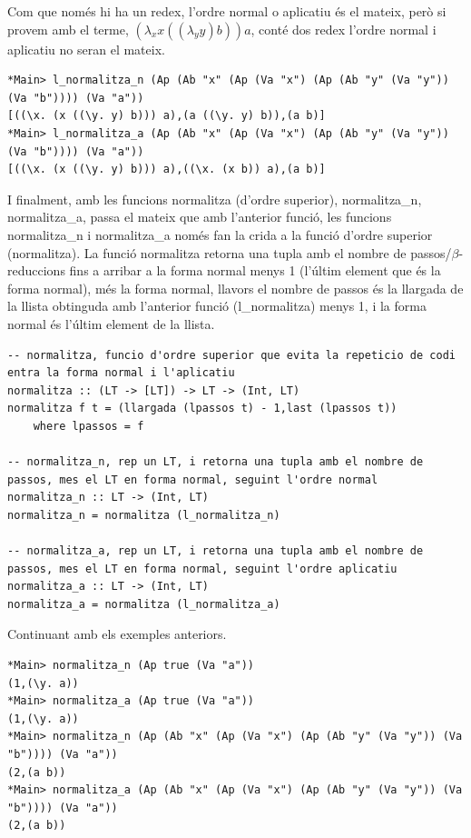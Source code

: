 \documentclass[10pt,a4paper]{article}
\begin{document}
Com que només hi ha un redex, l'ordre normal o aplicatiu és el mateix, però si provem amb el terme, $(\lambda_x x ((\lambda_y y) b)) a$, conté dos redex l'ordre normal i aplicatiu no seran el mateix.

\lstset{language=Haskell, breaklines=true, basicstyle=\footnotesize}
\begin{lstlisting}[frame=mystyle]
*Main> l_normalitza_n (Ap (Ab "x" (Ap (Va "x") (Ap (Ab "y" (Va "y")) (Va "b")))) (Va "a"))
[((\x. (x ((\y. y) b))) a),(a ((\y. y) b)),(a b)]
*Main> l_normalitza_a (Ap (Ab "x" (Ap (Va "x") (Ap (Ab "y" (Va "y")) (Va "b")))) (Va "a"))
[((\x. (x ((\y. y) b))) a),((\x. (x b)) a),(a b)]
\end{lstlisting}

I finalment, amb les funcions normalitza (d'ordre superior), normalitza\_n, normalitza\_a, passa el mateix que amb l'anterior funció, les funcions normalitza\_n i normalitza\_a només fan la crida a la funció d'ordre superior (normalitza). La funció normalitza retorna una tupla amb el nombre de passos/$\beta$-reduccions fins a arribar a la forma normal menys 1 (l'últim element que és la forma normal), més la forma normal, llavors el nombre de passos és la llargada de la llista obtinguda amb l'anterior funció (l\_normalitza) menys 1, i la forma normal és l'últim element de la llista.

\lstset{language=Haskell, breaklines=true, basicstyle=\footnotesize}
\begin{lstlisting}[frame=mystyle]
-- normalitza, funcio d'ordre superior que evita la repeticio de codi entra la forma normal i l'aplicatiu
normalitza :: (LT -> [LT]) -> LT -> (Int, LT)
normalitza f t = (llargada (lpassos t) - 1,last (lpassos t))
    where lpassos = f

-- normalitza_n, rep un LT, i retorna una tupla amb el nombre de passos, mes el LT en forma normal, seguint l'ordre normal
normalitza_n :: LT -> (Int, LT)
normalitza_n = normalitza (l_normalitza_n)

-- normalitza_a, rep un LT, i retorna una tupla amb el nombre de passos, mes el LT en forma normal, seguint l'ordre aplicatiu
normalitza_a :: LT -> (Int, LT)
normalitza_a = normalitza (l_normalitza_a)
\end{lstlisting}

Continuant amb els exemples anteriors.

\lstset{language=Haskell, breaklines=true, basicstyle=\footnotesize}
\begin{lstlisting}[frame=mystyle]
*Main> normalitza_n (Ap true (Va "a"))
(1,(\y. a))
*Main> normalitza_a (Ap true (Va "a"))
(1,(\y. a))
*Main> normalitza_n (Ap (Ab "x" (Ap (Va "x") (Ap (Ab "y" (Va "y")) (Va "b")))) (Va "a"))
(2,(a b))
*Main> normalitza_a (Ap (Ab "x" (Ap (Va "x") (Ap (Ab "y" (Va "y")) (Va "b")))) (Va "a"))
(2,(a b))
\end{lstlisting}
\end{document}
